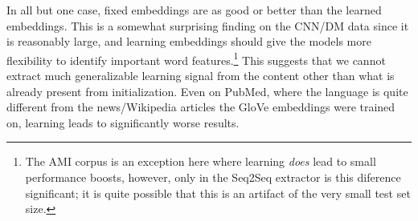  In all but one case,
fixed embeddings are as good or better than the learned embeddings.
This is a somewhat surprising finding on the CNN/DM data since it is reasonably
large, and learning embeddings should give the models more
flexibility to identify important word features.\footnote{The AMI corpus is an exception here where learning \emph{does} lead to small
performance boosts, however, only in the Seq2Seq extractor is this diference 
significant; it is quite possible that this is an artifact of the very small
test set size.}
This suggests that we cannot extract much generalizable learning signal 
from the content other than what is already present from initialization. 
Even on PubMed, where the language is quite different from the news/Wikipedia
articles the GloVe embeddings were trained on, learning leads to 
significantly worse results.




 
